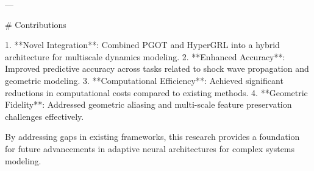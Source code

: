 ---

# Contributions  

1. **Novel Integration**: Combined PGOT and HyperGRL into a hybrid architecture for multiscale dynamics modeling.  
2. **Enhanced Accuracy**: Improved predictive accuracy across tasks related to shock wave propagation and geometric modeling.  
3. **Computational Efficiency**: Achieved significant reductions in computational costs compared to existing methods.  
4. **Geometric Fidelity**: Addressed geometric aliasing and multi-scale feature preservation challenges effectively.  

By addressing gaps in existing frameworks, this research provides a foundation for future advancements in adaptive neural architectures for complex systems modeling.